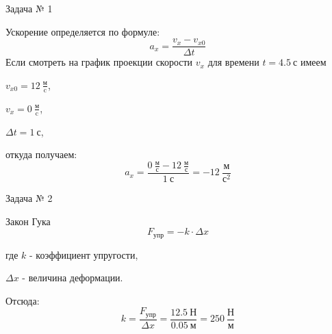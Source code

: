 \documentclass{minimal}
\begin{document}
	Задача № 1

	Ускорение определяется по формуле:
	\[
		a_x=\frac{v_x - v_{x0}}{\Delta t}
	\]
	Если смотреть на график проекции скорости $v_x$ для времени $t=4.5~\text{с}$ имеем 

	$v_{x0}=12~\frac{\text{м}}{\text{c}}$, 

	$v_x=0~\frac{\text{м}}{\text{c}}$,

	$\Delta t=1~\text{с}$, 

	откуда получаем:
	\[
		a_x = \frac{0~\frac{\text{м}}{\text{с}} - 12~\frac{\text{м}}{\text{с}}}{1~\text{с}}=-12~\frac{\text{м}}{\text{с}^2}
	\]

	Задача № 2


	Закон Гука
	\[
		F_{\text{упр}}=-k \cdot \Delta x
	\]

	где $k$ - коэффициент упругости,

	$\Delta x$ - величина деформации.

	Отсюда:
	\[
		k=\frac{F_{\text{упр}}}{\Delta x}=\frac{12.5~\text{Н}}{0.05~\text{м}}=250~\frac{\text{Н}}{\text{м}}
	\]
\end{document}
